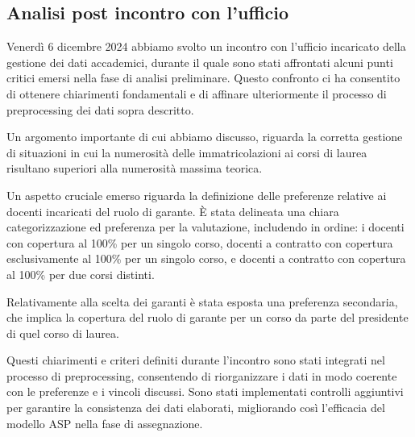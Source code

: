 \subsection{Analisi post incontro con l'ufficio}
\label{sec:analisi-post-call}

Venerdì 6 dicembre 2024 abbiamo svolto un incontro con l'ufficio incaricato della gestione dei dati accademici,
durante il quale sono stati affrontati alcuni punti critici emersi nella fase di analisi preliminare.
Questo confronto ci ha consentito di ottenere chiarimenti fondamentali e di affinare ulteriormente il
processo di preprocessing dei dati sopra descritto.

Un argomento importante di cui abbiamo discusso, riguarda la corretta gestione di situazioni in cui la
numerosità delle immatricolazioni ai corsi di laurea risultano superiori alla numerosità massima teorica.

Un aspetto cruciale emerso riguarda la definizione delle preferenze relative ai docenti incaricati
del ruolo di garante. È stata delineata una chiara categorizzazione ed preferenza per la valutazione, includendo in ordine:
i docenti con copertura al 100\% per un singolo corso, docenti a contratto con copertura esclusivamente al 100\% per un singolo corso,
e docenti a contratto con copertura al 100\% per due corsi distinti.

Relativamente alla scelta dei garanti è stata esposta una preferenza secondaria, che implica la copertura del ruolo di
garante per un corso da parte del presidente di quel corso di laurea.

Questi chiarimenti e criteri definiti durante l’incontro sono stati integrati nel processo di preprocessing,
consentendo di riorganizzare i dati in modo coerente con le preferenze e i vincoli discussi.
Sono stati implementati controlli aggiuntivi per garantire la consistenza dei dati elaborati,
migliorando così l'efficacia del modello ASP nella fase di assegnazione.
